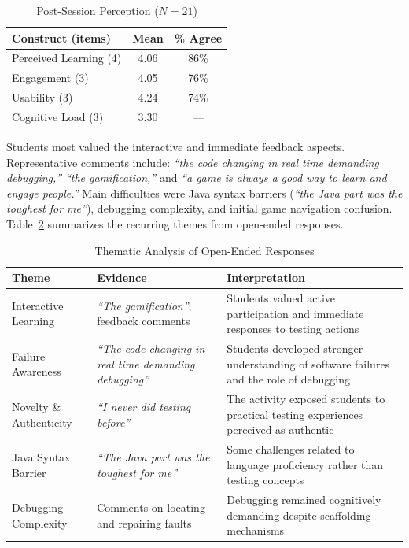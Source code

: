 \documentclass[conference]{IEEEtran}
\begin{document}
\begin{table}[htbp]
\caption{Post-Session Perception ($N = 21$)}
\label{tab:perception}
\centering
\small
\begin{tabular}{lcc}
\toprule
Construct (items) & Mean & \% Agree \\
\midrule
Perceived Learning (4) & 4.06 & 86\% \\
Engagement (3) & 4.05 & 76\% \\
Usability (3) & 4.24 & 74\% \\
Cognitive Load (3) & 3.30 & --- \\
\bottomrule
\end{tabular}
\end{table}

Students most valued the interactive and immediate feedback aspects.
Representative comments include: \emph{``the code changing in real time demanding debugging,''} \emph{``the gamification,''} and \emph{``a game is always a good way to learn and engage people.''}
Main difficulties were Java syntax barriers (\emph{``the Java part was the toughest for me''}), debugging complexity, and initial game navigation confusion.
Table~\ref{tab:themes} summarizes the recurring themes from open-ended responses.

\begin{table}[htbp]
\caption{Thematic Analysis of Open-Ended Responses}
\label{tab:themes}
\centering
\small
\begin{tabular}{p{1.8cm}p{2.4cm}p{2.6cm}}
\toprule
Theme & Evidence & Interpretation \\
\midrule
Interactive Learning & \emph{``The gamification''}; feedback comments & Students valued active participation and immediate responses to testing actions \\
\addlinespace
Failure Awareness & \emph{``The code changing in real time demanding debugging''} & Students developed stronger understanding of software failures and the role of debugging \\
\addlinespace
Novelty \& Authenticity & \emph{``I never did testing before''} & The activity exposed students to practical testing experiences perceived as authentic \\
\addlinespace
Java Syntax Barrier & \emph{``The Java part was the toughest for me''} & Some challenges related to language proficiency rather than testing concepts \\
\addlinespace
Debugging Complexity & Comments on locating and repairing faults & Debugging remained cognitively demanding despite scaffolding mechanisms \\
\bottomrule
\end{tabular}
\end{table}
\end{document}
